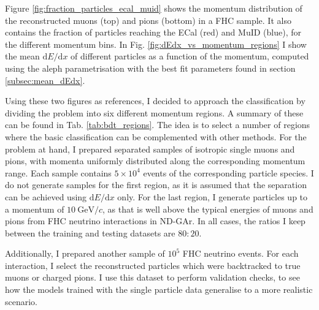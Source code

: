Figure \ref{fig:fraction_particles_ecal_muid} shows the momentum distribution of the reconstructed muons (top) and pions (bottom) in a FHC sample. It also contains the fraction of particles reaching the ECal (red) and MuID (blue), for the different momentum bins. In Fig. \ref{fig:dEdx_vs_momentum_regions} I show the mean $\mathrm{d}E/\mathrm{d}x$ of different particles as a function of the momentum, computed using the \gls{aleph} parametrisation with the best fit parameters found in section \ref{subsec:mean_dEdx}.

Using these two figures as references, I decided to approach the classification by dividing the problem into six different momentum regions. A summary of these can be found in Tab. \ref{tab:bdt_regions}. The idea is to select a number of regions where the basic classification can be complemented with other methods. For the problem at hand, I prepared separated samples of isotropic single muons and pions, with momenta uniformly distributed along the corresponding momentum range. Each sample contains $5 \times 10^{4}$ events of the corresponding particle species. I do not generate samples for the first region, as it is assumed that the separation can be achieved using $\mathrm{d}E/\mathrm{d}x$ only. For the last region, I generate particles up to a momentum of $10~\mathrm{GeV}/c$, as that is well above the typical energies of muons and pions from FHC neutrino interactions in ND-GAr. In all cases, the ratios I keep between the training and testing datasets are $80:20$.

Additionally, I prepared another sample of $10^{5}$ FHC neutrino events. For each interaction, I select the reconstructed particles which were backtracked to true muons or charged pions. I use this dataset to perform validation checks, to see how the models trained with the single particle data generalise to a more realistic scenario.

